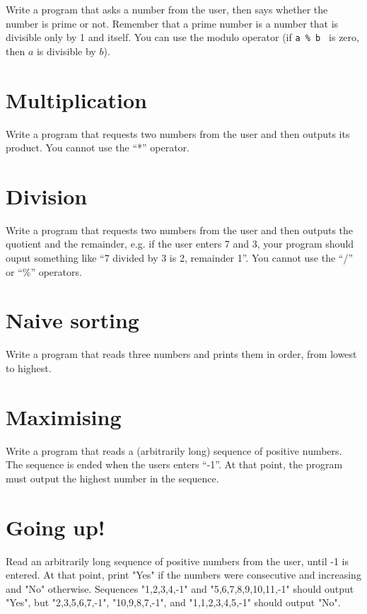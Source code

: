 \documentclass{article}
\begin{document}
Write a program that asks a number from the user, then says whether
the number is prime or not. Remember that a prime number is a number
that is divisible only by 1 and itself. You can use the modulo
operator (if \verb+a % b + is zero, then $a$ is divisible by $b$).

\section{Multiplication}
\label{sec:multiplication}

Write a program that requests two numbers from the user and then
outputs its product. You cannot use the ``*'' operator. 

\section{Division}
\label{sec:division}

Write a program that requests two numbers from the user and then
outputs the quotient and the remainder, e.g. if the user enters 7 and
3, your program should ouput something like ``7 divided by 3 is 2,
remainder 1''. You cannot use the ``/'' or ``\%'' operators. 

\section{Naive sorting}
\label{sec:naive-sorting}

Write a program that reads three numbers and prints them in order, from
lowest to highest. 

\section{Maximising}
\label{sec:maximising}

Write a program that reads a (arbitrarily long) sequence of positive
numbers. The sequence is ended when the users enters ``-1''. At that
point, the program must output the highest number in the sequence. 

\section{Going up!}
\label{sec:going-up}

Read an arbitrarily long sequence of positive numbers from the user,
until -1 is entered. At that point, print "Yes" if the numbers were
consecutive and increasing and "No" otherwise. Sequences "1,2,3,4,-1"
and "5,6,7,8,9,10,11,-1" should output "Yes", but "2,3,5,6,7,-1",
"10,9,8,7,-1", and "1,1,2,3,4,5,-1" should output "No".
\end{document}
